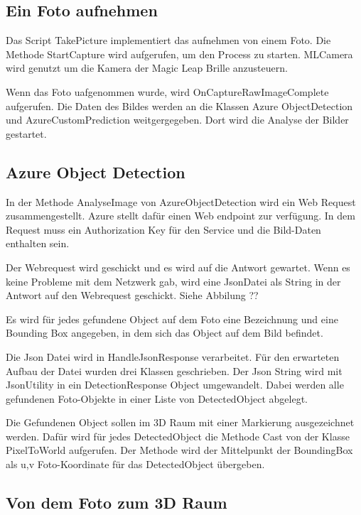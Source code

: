 \documentclass[german,a4paper, 12pt]{llncs}
\begin{document}
\subsection{Ein Foto aufnehmen}

Das Script TakePicture implementiert das aufnehmen von einem Foto.
Die Methode StartCapture wird aufgerufen, um den Process zu starten. 
MLCamera wird genutzt um die Kamera der Magic Leap Brille anzusteuern.


Wenn das Foto uafgenommen wurde, wird OnCaptureRawImageComplete aufgerufen. Die Daten des Bildes werden an die Klassen Azure ObjectDetection und AzureCustomPrediction weitgergegeben. Dort wird die Analyse der Bilder gestartet. 

\subsection{Azure Object Detection}

In der Methode AnalyseImage von AzureObjectDetection wird ein Web Request zusammengestellt. Azure stellt dafür einen Web endpoint zur verfügung. In dem Request muss ein Authorization Key für den Service und die Bild-Daten enthalten sein.

Der Webrequest wird geschickt und es wird auf die Antwort gewartet. Wenn es keine Probleme mit dem Netzwerk gab, wird eine JsonDatei als String in der Antwort auf den Webrequest geschickt. Siehe Abbilung ??


Es wird für jedes gefundene Object auf dem Foto eine Bezeichnung und eine Bounding Box angegeben, in dem sich das Object auf dem Bild befindet. 

Die Json Datei wird in HandleJsonResponse verarbeitet. Für den erwarteten Aufbau der Datei wurden drei Klassen geschrieben. Der Json String wird mit JsonUtility in ein DetectionResponse Object umgewandelt. Dabei werden alle gefundenen Foto-Objekte in einer Liste von DetectedObject abgelegt. %

Die Gefundenen Object sollen im 3D Raum mit einer Markierung ausgezeichnet werden. 
Dafür wird für jedes DetectedObject die Methode Cast von der Klasse PixelToWorld aufgerufen. Der Methode wird der Mittelpunkt der BoundingBox als u,v Foto-Koordinate für das DetectedObject übergeben.

\subsection{Von dem Foto zum 3D Raum}
\end{document}
